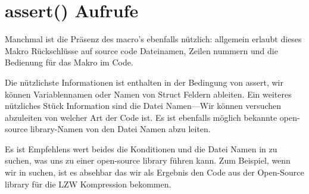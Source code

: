 \section{assert() Aufrufe}

Manchmal ist die Präsenz des  macro's ebenfalls nützlich:
allgemein erlaubt dieses Makro Rückschlüsse auf source code Dateinamen,
Zeilen nummern und die Bedienung für das Makro im Code.

Die nützlichste Informationen ist enthalten in der Bedingung von assert, wir können Variablennamen oder Namen
von Struct Feldern ableiten. Ein weiteres nützliches Stück Information sind die Datei Namen---Wir können versuchen
abzuleiten von welcher Art der Code ist. 
Es ist ebenfalls möglich bekannte open-source library-Namen von den Datei Namen abzu leiten.



Es ist Empfehlens wert beides die Konditionen und die Datei Namen in  zu suchen, was uns zu einer open-source library führen kann. 
Zum Beispiel, wenn wir  in  suchen, ist es absehbar das wir als Ergebnis den Code aus der 
Open-Source library für die LZW Kompression bekommen. 
